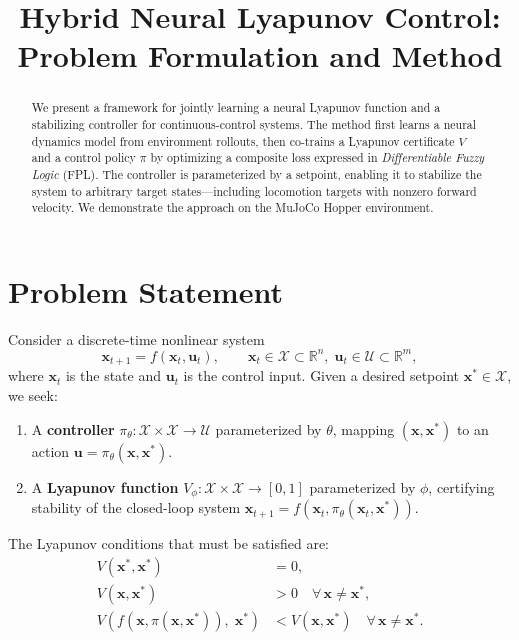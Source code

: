 \documentclass[11pt]{article}
\title{Hybrid Neural Lyapunov Control:\\Problem Formulation and Method}
\author{}
\date{}
\newcommand{\R}{\mathbb{R}}
\newcommand{\x}{\bm{x}}
\newcommand{\xstar}{\bm{x}^*}
\newcommand{\uu}{\bm{u}}
\theoremstyle{definition}
\begin{document}
\maketitle

\begin{abstract}
We present a framework for jointly learning a neural Lyapunov function and a
stabilizing controller for continuous-control systems.  The method first learns
a neural dynamics model from environment rollouts, then co-trains a Lyapunov
certificate $V$ and a control policy $\pi$ by optimizing a composite loss
expressed in \emph{Differentiable Fuzzy Logic} (FPL).  The controller is
parameterized by a setpoint, enabling it to stabilize the system to arbitrary
target states---including locomotion targets with nonzero forward velocity.
We demonstrate the approach on the MuJoCo Hopper environment.
\end{abstract}

\section{Problem Statement}

Consider a discrete-time nonlinear system
\begin{equation}\label{eq:dynamics}
    \x_{t+1} = f(\x_t, \uu_t),
    \qquad \x_t \in \mathcal{X} \subset \R^n,\;
           \uu_t \in \mathcal{U} \subset \R^m,
\end{equation}
where $\x_t$ is the state and $\uu_t$ is the control input.
Given a desired setpoint $\xstar \in \mathcal{X}$, we seek:

\begin{enumerate}
    \item A \textbf{controller} $\pi_\theta : \mathcal{X} \times \mathcal{X} \to \mathcal{U}$
          parameterized by $\theta$, mapping $(\x, \xstar)$ to an action
          $\uu = \pi_\theta(\x, \xstar)$.

    \item A \textbf{Lyapunov function} $V_\phi : \mathcal{X} \times \mathcal{X} \to [0,1]$
          parameterized by $\phi$, certifying stability of the closed-loop
          system $\x_{t+1} = f(\x_t, \pi_\theta(\x_t, \xstar))$.
\end{enumerate}

\noindent The Lyapunov conditions that must be satisfied are:
\begin{align}
    V(\xstar, \xstar) &= 0, \label{eq:lyap_zero}\\
    V(\x, \xstar)     &> 0 \quad \forall\, \x \neq \xstar, \label{eq:lyap_pos}\\
    V(f(\x, \pi(\x, \xstar)),\; \xstar) &< V(\x, \xstar) \quad \forall\, \x \neq \xstar. \label{eq:lyap_decrease}
\end{align}
\end{document}
